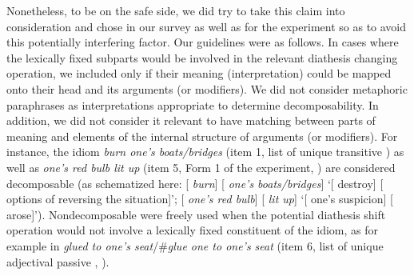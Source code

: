 \documentclass[output=paper]{langsci/langscibook}
\begin{document}
Nonetheless, to be on the safe side, we did try to take this claim into
consideration and chose  in our survey as well as  for the
experiment so as to avoid this potentially interfering factor. Our guidelines
were as follows. In cases where the lexically fixed subparts would be involved
in the relevant diathesis changing operation, we included  only if their
meaning (interpretation) could be mapped onto their head and its arguments (or
modifiers). We did not consider metaphoric paraphrases as interpretations
appropriate to determine decomposability. In addition, we did not consider it
relevant to have matching between parts of meaning and elements of the internal
structure of arguments (or modifiers). For instance, the idiom \emph{burn
one’s boats/bridges} (item 1, list of unique transitive ) as well as
\emph{one’s red bulb lit up} (item 5, Form 1 of the experiment, )
are considered decomposable (as schematized here: [ \emph{burn}]
[ \emph{one’s boats/bridges}] ‘[ destroy] [ options of
reversing the situation]’; [ \emph{one’s red bulb}] [ \emph{lit
up}] ‘[ one’s suspicion] [ arose]’). Nondecomposable  were
freely used when the potential diathesis shift operation would not involve a
lexically fixed constituent of the idiom, as for example in \emph{glued to
one’s seat}\slash \#\emph{glue one to one’s seat} (item 6, list of unique
adjectival passive , ).
\end{document}
